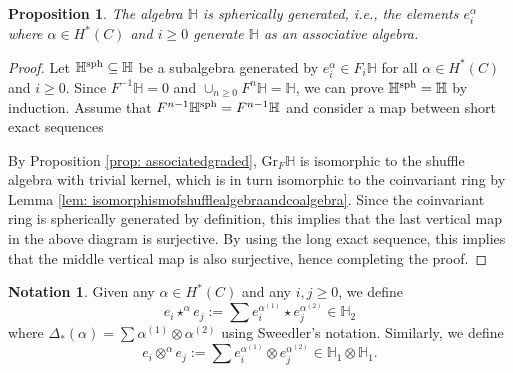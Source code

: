 \documentclass[10pt]{amsart}
\newcommand{\BH}{\mathbb{H}}
\newcommand{\+}{{}^+}
\newcommand{\Gr}{\mathrm{Gr}}
\newtheorem {proposition}[theorem]{Proposition}
\theoremstyle{definition}
\theoremstyle {definition}
\newtheorem{notation}[theorem]{Notation}
\theoremstyle {definition}
\begin{document}
\begin{proposition} \label{prop: sphericalgeneration}
The algebra $\BH$ is spherically generated, i.e., the elements $e^{\alpha}_i$ where $\alpha \in H^*(C)$ and $i \geq 0$ generate $\BH$ as an associative algebra. 
\end{proposition}


\begin{proof} Let $\BH^{\textnormal{sph}}\subseteq \BH$ be a subalgebra generated by $e_i^\alpha\in F_i\BH$ for all $\alpha\in H^*(C)$ and $i\geq 0$. Since $F^{-1}\BH=0$ and $\cup_{n\geq 0} F^n \BH=\BH$, we can prove $\BH^{\textnormal{sph}}=\BH$ by induction. Assume that $F^{n-1}\BH^{\textnormal{sph}}= F^{n-1}\BH$ and consider a map between short exact sequences
\begin{center}
\end{center}
By Proposition \ref{prop: associatedgraded}, $\Gr_F\BH$ is isomorphic to the shuffle algebra with trivial kernel, which is in turn isomorphic to the coinvariant ring by Lemma \ref{lem: isomorphismofshufflealgebraandcoalgebra}. Since the coinvariant ring is spherically generated by definition, this implies that the last vertical map in the above diagram is surjective. By using the long exact sequence, this implies that the middle vertical map is also surjective, hence completing the proof. 




\end{proof}



\begin{notation}
Given any $\alpha \in  H^*(C)$ and any $i,j \geq 0$, we define
 \[ e_i \star^{\alpha} e_j:= \sum e^{\alpha^{(1)}}_i \star e^{\alpha^{(2)}}_j \in \BH_2\] 
where $\Delta_{*}(\alpha) = \sum \alpha^{(1)} \otimes \alpha^{(2)}$ using Sweedler's notation. Similarly, we define 
 \[ e_i \otimes^{\alpha} e_j:= \sum e^{\alpha^{(1)}}_i \otimes e^{\alpha^{(2)}}_j\in \BH_1\otimes \BH_1. \] 
\end{notation}
\end{document}
